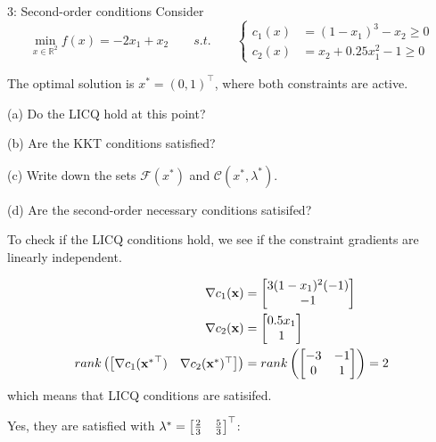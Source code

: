 
\begin{problem}{3: Second-order conditions}
Consider
\[
  \min_{x \in \mathbb{R}^{2}} f(x) = -2x_1 + x_2 \qquad s.t. \qquad
  \left\{
  \begin{aligned}
    c_1(x) & = (1-x_1)^3 - x_2 \geq 0     \\
    c_2(x) & = x_2 + 0.25x_1^2 - 1 \geq 0
  \end{aligned}
  \right
  .\]

The optimal solution is $x^{*} = (0, 1)^{\top}$, where both constraints are active.

\medskip

(a) Do the LICQ hold at this point?

\medskip

(b) Are the KKT conditions satisfied?

\medskip

(c) Write down the sets $\mathcal{F}(x^{*})$ and $\mathcal{C}(x^{*}, \lambda^{*})$.

\medskip

(d) Are the second-order necessary conditions satisifed?


\end{problem}




To check if the LICQ conditions hold, we see if the constraint gradients are linearly independent.

\begin{align*}
  \nabla c_1(\mathbf{x})                        & = \begin{bmatrix} 3(1-x_1)^2(-1)                                              \\ -1 \end{bmatrix} \\
  \nabla c_2(\mathbf{x})                        & = \begin{bmatrix} 0.5x_1                                                      \\ 1 \end{bmatrix} \\
  rank \left(\begin{bmatrix} \nabla c_1(\mathbf{x^*}^{\top}) & \nabla c_2(\mathbf{x^*})^{\top} \end{bmatrix}\right) & = rank\left(\begin{bmatrix} -3 & -1 \\ 0 & 1 \end{bmatrix}\right) = 2
\end{align*}
which means that LICQ conditions are satisifed.


Yes, they are satisfied with $\lambda^* = \begin{bmatrix}  \frac{2}{3} & \frac{5}{3} \end{bmatrix}^{\top}$:

